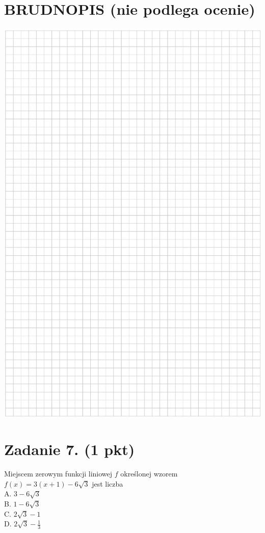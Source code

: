 \documentclass[10pt]{article}
\begin{document}
\section*{BRUDNOPIS (nie podlega ocenie)}
\begin{center}
\includegraphics[max width=\textwidth]{2024_11_21_d51d653f4fe4a5bb0c33g-03}
\end{center}

\section*{Zadanie 7. (1 pkt)}
Miejscem zerowym funkcji liniowej \(f\) określonej wzorem \(f(x)=3(x+1)-6 \sqrt{3}\) jest liczba\\
A. \(3-6 \sqrt{3}\)\\
B. \(1-6 \sqrt{3}\)\\
C. \(2 \sqrt{3}-1\)\\
D. \(2 \sqrt{3}-\frac{1}{3}\)
\end{document}
